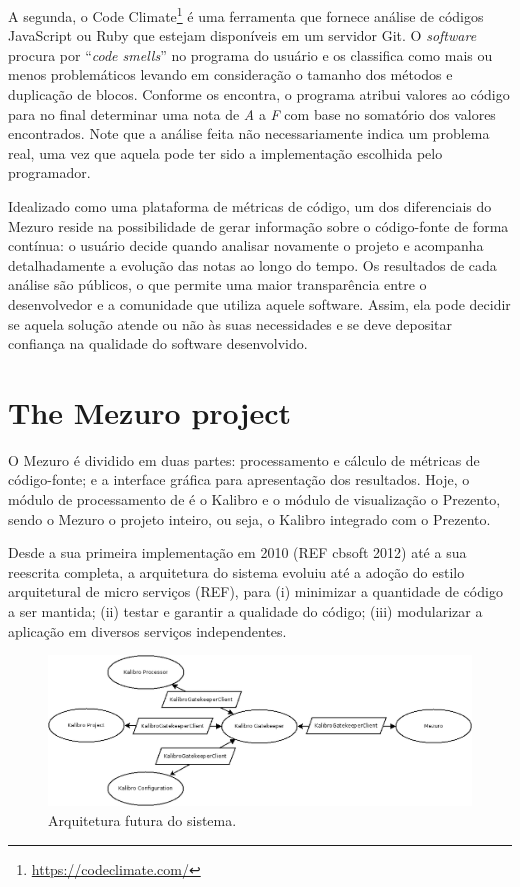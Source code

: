 \documentclass{llncs}
\begin{document}
A segunda, o Code Climate\footnote{\url{https://codeclimate.com/}} é uma
ferramenta que fornece análise de códigos JavaScript ou Ruby que estejam
disponíveis em um servidor Git. O \textit{software} procura por ``\textit{code
smells}'' no programa do usuário e os classifica como mais ou menos
problemáticos levando em consideração o tamanho dos métodos e duplicação de
blocos. Conforme os encontra, o programa atribui valores ao código para no
final determinar uma nota de \textit{A} a \textit{F} com base no somatório dos
valores encontrados. Note que a análise feita não necessariamente indica um
problema real, uma vez que aquela pode ter sido a implementação escolhida pelo
programador.

Idealizado como uma plataforma de métricas de código, um dos diferenciais do
Mezuro reside na possibilidade de gerar informação sobre o código-fonte de
forma contínua: o usuário decide quando analisar novamente o projeto e
acompanha detalhadamente a evolução das notas ao longo do tempo. Os resultados
de cada análise são públicos, o que permite uma maior transparência entre o
desenvolvedor e a comunidade que utiliza aquele software. Assim, ela
pode decidir se aquela solução atende ou não às suas necessidades e se deve
depositar confiança na qualidade do software desenvolvido.

\section{The Mezuro project}
\label{sec:mezuro}

O Mezuro é dividido em duas partes: processamento e cálculo de métricas de
código-fonte; e a interface gráfica para apresentação dos resultados. Hoje, o
módulo de processamento de é o Kalibro e o módulo de visualização o Prezento,
sendo o Mezuro o projeto inteiro, ou seja, o Kalibro integrado com o Prezento.

Desde a sua primeira implementação em 2010 (REF cbsoft 2012) até a sua
reescrita completa, a arquitetura do sistema evoluiu até a adoção do estilo
arquitetural de micro serviços (REF), para  (i) minimizar a quantidade de
código a ser mantida; (ii) testar e garantir a qualidade do código; (iii)
modularizar a aplicação em diversos serviços independentes.

\begin{figure}[H]
  \centering
    \includegraphics[width=\textwidth]{images/mezuro-architecture-predicted.png}
  \caption{Arquitetura futura do sistema.}
  \label{fig:architecture-2}
\end{figure}
\end{document}
